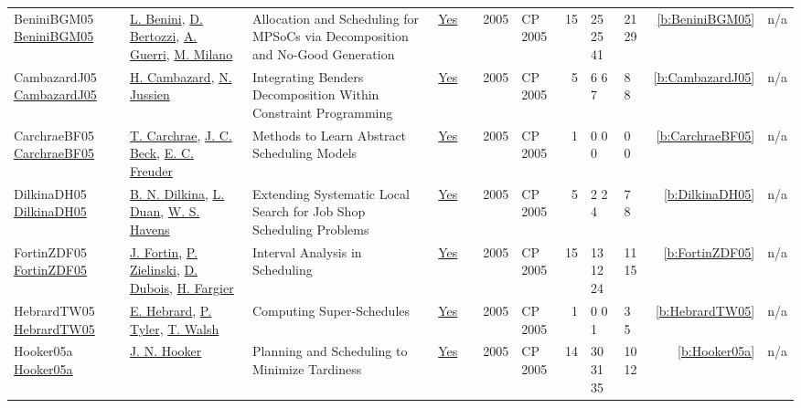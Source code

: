 {\begin{longtable}{>{\raggedright\arraybackslash}p{3cm}>{\raggedright\arraybackslash}p{4.5cm}>{\raggedright\arraybackslash}p{6.0cm}rrrp{2.5cm}rp{1cm}p{1cm}rr}
BeniniBGM05 \href{https://doi.org/10.1007/11564751_11}{BeniniBGM05} & \hyperref[auth:a245]{L. Benini}, \hyperref[auth:a375]{D. Bertozzi}, \hyperref[auth:a376]{A. Guerri}, \hyperref[auth:a143]{M. Milano} & \cellcolor{green!10}Allocation and Scheduling for MPSoCs via Decomposition and No-Good Generation & \href{../works/BeniniBGM05.pdf}{Yes} & \cite{BeniniBGM05} & 2005 & CP 2005 & 15 & 25 25 41 & 21 29 & \ref{b:BeniniBGM05} & n/a\\
CambazardJ05 \href{https://doi.org/10.1007/11564751_58}{CambazardJ05} & \hyperref[auth:a999]{H. Cambazard}, \hyperref[auth:a247]{N. Jussien} & Integrating Benders Decomposition Within Constraint Programming & \href{../works/CambazardJ05.pdf}{Yes} & \cite{CambazardJ05} & 2005 & CP 2005 & 5 & 6 6 7 & 8 8 & \ref{b:CambazardJ05} & n/a\\
CarchraeBF05 \href{https://doi.org/10.1007/11564751_80}{CarchraeBF05} & \hyperref[auth:a272]{T. Carchrae}, \hyperref[auth:a89]{J. C. Beck}, \hyperref[auth:a273]{E. C. Freuder} & \cellcolor{green!10}Methods to Learn Abstract Scheduling Models & \href{../works/CarchraeBF05.pdf}{Yes} & \cite{CarchraeBF05} & 2005 & CP 2005 & 1 & 0 0 0 & 0 0 & \ref{b:CarchraeBF05} & n/a\\
DilkinaDH05 \href{https://doi.org/10.1007/11564751_60}{DilkinaDH05} & \hyperref[auth:a267]{B. N. Dilkina}, \hyperref[auth:a268]{L. Duan}, \hyperref[auth:a269]{W. S. Havens} & Extending Systematic Local Search for Job Shop Scheduling Problems & \href{../works/DilkinaDH05.pdf}{Yes} & \cite{DilkinaDH05} & 2005 & CP 2005 & 5 & 2 2 4 & 7 8 & \ref{b:DilkinaDH05} & n/a\\
FortinZDF05 \href{https://doi.org/10.1007/11564751_19}{FortinZDF05} & \hyperref[auth:a263]{J. Fortin}, \hyperref[auth:a264]{P. Zielinski}, \hyperref[auth:a265]{D. Dubois}, \hyperref[auth:a266]{H. Fargier} & Interval Analysis in Scheduling & \href{../works/FortinZDF05.pdf}{Yes} & \cite{FortinZDF05} & 2005 & CP 2005 & 15 & 13 12 24 & 11 15 & \ref{b:FortinZDF05} & n/a\\
HebrardTW05 \href{https://doi.org/10.1007/11564751_117}{HebrardTW05} & \hyperref[auth:a1]{E. Hebrard}, \hyperref[auth:a275]{P. Tyler}, \hyperref[auth:a276]{T. Walsh} & Computing Super-Schedules & \href{../works/HebrardTW05.pdf}{Yes} & \cite{HebrardTW05} & 2005 & CP 2005 & 1 & 0 0 1 & 3 5 & \ref{b:HebrardTW05} & n/a\\
Hooker05a \href{https://doi.org/10.1007/11564751_25}{Hooker05a} & \hyperref[auth:a160]{J. N. Hooker} & \cellcolor{green!10}Planning and Scheduling to Minimize Tardiness & \href{../works/Hooker05a.pdf}{Yes} & \cite{Hooker05a} & 2005 & CP 2005 & 14 & 30 31 35 & 10 12 & \ref{b:Hooker05a} & n/a\\

\end{longtable}}
